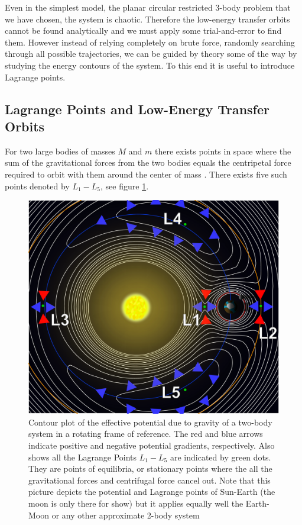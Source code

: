 Even in the simplest model, the planar circular restricted 3-body problem that we have chosen, the system is chaotic. Therefore the low-energy transfer orbits cannot be found analytically and we must apply some trial-and-error to find them. However instead of relying completely on brute force, randomly searching through all possible trajectories, we can be guided by theory some of the way by studying the energy contours of the system. To this end it is useful to introduce Lagrange points.

\subsection{Lagrange Points and Low-Energy Transfer Orbits}
For two large bodies of masses $M$ and $m$ there exists points in space where the sum of the gravitational forces from the two bodies equals the centripetal force required to orbit with them around the center of mass \cite{Murray1999}. There exists five such points denoted by $L_1 - L_5$, see figure \ref{fig:lagrange-points}.

\begin{figure}[ht]
\centering
\includegraphics[scale=0.32]{fig/lagrange_points.pdf}
\caption{Contour plot of the effective potential due to gravity of a two-body system in a rotating frame of reference. The red and blue arrows indicate positive and negative potential gradients, respectively. Also shows all the Lagrange Points $L_1-L_5$ are indicated by green dots. They are points of equilibria, or stationary points where the all the gravitational forces and centrifugal force cancel out. Note that this picture depicts the potential and Lagrange points of Sun-Earth (the moon is only there for show) but it applies equally well the Earth-Moon or any other approximate 2-body system}
\label{fig:lagrange-points}
\end{figure}

